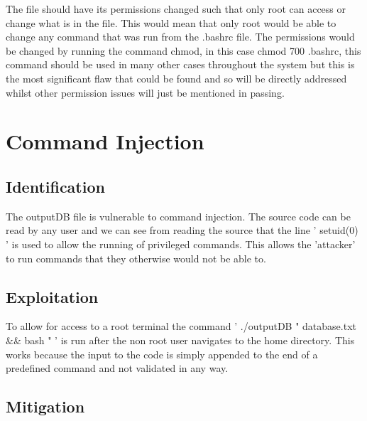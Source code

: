 \documentclass[paper=a4, fontsize=11pt]{scrartcl}
\numberwithin{equation}{section}		%
\numberwithin{figure}{section}			%
\numberwithin{table}{section}				%
\begin{document}

The file should have its permissions changed such that only root can access or change what is in the file. This would mean that only root would be able to change any command that was run from the .bashrc file. The permissions would be changed by running the command chmod, in this case chmod 700 .bashrc, this command should be used in many other cases throughout the system but this is the most significant flaw that could be found and so will be directly addressed whilst other permission issues will just be mentioned in passing. 

\section*{Command Injection}
\subsection*{Identification}


The outputDB file is vulnerable to command injection. The source code can be read by any user and we can see from reading the source that the line ' setuid(0) ' is used to allow the running of privileged commands. This allows the 'attacker' to run commands that they otherwise would not be able to.

\subsection*{Exploitation}


To allow for access to a root terminal the command ' ./outputDB " database.txt \&\& bash " ' is run after the non root user navigates to the home directory. This works because the input to the code is simply appended to the end of a predefined command and not validated in any way.

\subsection*{Mitigation}
\end{document}
